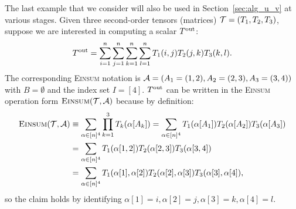 \documentclass[letterpaper,11pt]{article}
\def\Einsum{\textsc{Einsum}}
\newcommand{\tensorcontraction}{\textsc{Einsum}}
\begin{document}
\begin{bibunit}[plainnat]
\begin{example}
\label{eg:running}
The last example that we consider will also be used in Section~\ref{sec:alg_u_v} at various stages. Given three second-order tensors (matrices) ${\mathcal{T}} = (T_1, T_2, T_3)$, suppose we are interested in computing a scalar $T^{\rm out}$:
\begin{align*}
T^{\rm out} = \sum_{i = 1}^{n} \sum_{j = 1}^{n} \sum_{k = 1}^{n} \sum_{l = 1}^{n} T_1 (i, j) T_2 (j, k) T_3 (k, l).
\end{align*}
The corresponding \Einsum{} notation is ${\mathcal{A}} = (A_1 = (1, 2), A_2 = (2, 3), A_3 = (3, 4))$ with $B = \emptyset$ and the index set $I = [4]$. $T^{\rm out}$ can be written in the \Einsum{} operation form $\tensorcontraction(\calT, \calA)$ because by definition:
\begin{align*}
\tensorcontraction(\calT, \calA) & \equiv \sum_{\alpha \in [n]^{4}} \prod_{k = 1}^{3} T_{k} (\alpha [A_k]) = \sum_{\alpha \in [n]^{4}} T_1 (\alpha [A_1]) T_2 (\alpha [A_2]) T_3 (\alpha [A_3]) \\
& = \sum_{\alpha \in [n]^{4}} T_1 (\alpha[1, 2]) T_2 (\alpha[2, 3]) T_3 (\alpha[3, 4]) \\
& = \sum_{\alpha \in [n]^{4}} T_1 (\alpha[1], \alpha[2]) T_2 (\alpha[2], \alpha[3]) T_3 (\alpha[3], \alpha[4]),
\end{align*}
so the claim holds by identifying $\alpha [1] = i, \alpha [2] = j, \alpha [3] = k, \alpha [4] = l$.
\end{example}

\iffalse
\begin{figure}[ht]
\centering
{}
\end{figure}
\end{bibunit}
\end{document}
